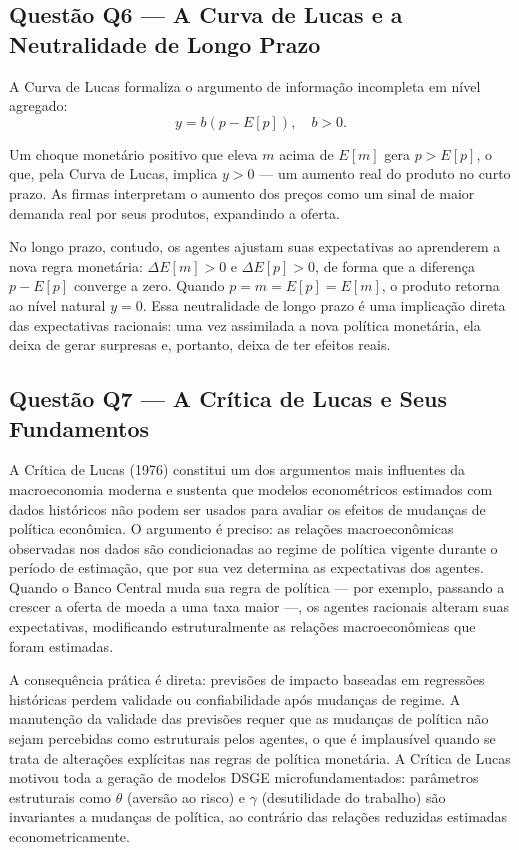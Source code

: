 \documentclass[12pt, a4paper]{article}
\begin{document}
\subsection{Questão Q6 --- A Curva de Lucas e a Neutralidade de Longo Prazo}

A Curva de Lucas formaliza o argumento de informação incompleta em nível agregado:
\[
y = b(p - E[p]), \quad b > 0.
\]

Um choque monetário positivo que eleva $m$ acima de $E[m]$ gera $p > E[p]$, o que, pela Curva de Lucas, implica $y > 0$ — um aumento real do produto no curto prazo. As firmas interpretam o aumento dos preços como um sinal de maior demanda real por seus produtos, expandindo a oferta.

No longo prazo, contudo, os agentes ajustam suas expectativas ao aprenderem a nova regra monetária: $\Delta E[m] > 0$ e $\Delta E[p] > 0$, de forma que a diferença $p - E[p]$ converge a zero. Quando $p = m = E[p] = E[m]$, o produto retorna ao nível natural $y = 0$. Essa neutralidade de longo prazo é uma implicação direta das expectativas racionais: uma vez assimilada a nova política monetária, ela deixa de gerar surpresas e, portanto, deixa de ter efeitos reais.

\subsection{Questão Q7 --- A Crítica de Lucas e Seus Fundamentos}

A Crítica de Lucas (1976) constitui um dos argumentos mais influentes da macroeconomia moderna e sustenta que modelos econométricos estimados com dados históricos não podem ser usados para avaliar os efeitos de mudanças de política econômica. O argumento é preciso: as relações macroeconômicas observadas nos dados são condicionadas ao regime de política vigente durante o período de estimação, que por sua vez determina as expectativas dos agentes. Quando o Banco Central muda sua regra de política — por exemplo, passando a crescer a oferta de moeda a uma taxa maior —, os agentes racionais alteram suas expectativas, modificando estruturalmente as relações macroeconômicas que foram estimadas.

A consequência prática é direta: previsões de impacto baseadas em regressões históricas perdem validade ou confiabilidade após mudanças de regime. A manutenção da validade das previsões requer que as mudanças de política não sejam percebidas como estruturais pelos agentes, o que é implausível quando se trata de alterações explícitas nas regras de política monetária. A Crítica de Lucas motivou toda a geração de modelos DSGE microfundamentados: parâmetros estruturais como $\theta$ (aversão ao risco) e $\gamma$ (desutilidade do trabalho) são invariantes a mudanças de política, ao contrário das relações reduzidas estimadas econometricamente.
\end{document}
